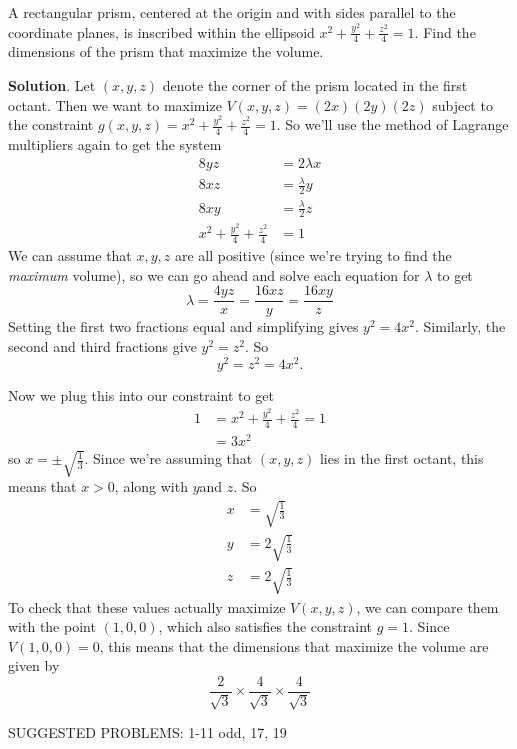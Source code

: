 \documentclass[10pt,]{book}
\theoremstyle{ptxplainnotitle}
\theoremstyle{ptxplaintitle}
\theoremstyle{ptxplainnotitle}
\theoremstyle{ptxplaintitle}
\theoremstyle{ptxplainnotitle}
\theoremstyle{ptxplaintitle}
\theoremstyle{ptxdefinitionnotitle}
\theoremstyle{ptxdefinitiontitle}
\theoremstyle{ptxdefinitionnotitle}
\theoremstyle{ptxdefinitiontitle}
\theoremstyle{ptxdefinitionnotitle}
\theoremstyle{ptxdefinitiontitle}
\theoremstyle{ptxdefinitionnotitle}
\theoremstyle{ptxdefinitiontitle}
\theoremstyle{ptxdefinitionnotitle}
\theoremstyle{ptxdefinitiontitle}
\numberwithin{equation}{section}
\begin{document}
\begin{example}\label{example-maximizing-the-volume-of-a-prism-within-an-ellipsoid}
\hypertarget{p-1109}{}%
A rectangular prism, centered at the origin and with sides parallel to the coordinate planes, is inscribed within the ellipsoid \(x^{2} + \frac{y^{2}}{4} + \frac{z^{2}}{4} = 1\). Find the dimensions of the prism that maximize the volume.%
\par\smallskip%
\noindent\textbf{Solution}.\hypertarget{solution-175}{}\quad%
\hypertarget{p-1110}{}%
Let \((x,y,z)\) denote the corner of the prism located in the first octant. Then we want to maximize \(V(x,y,z) = (2x)(2y)(2z)\) subject to the constraint \(g(x,y,z) = x^{2} + \frac{y^{2}}{4} + \frac{z^{2}}{4} = 1\). So we'll use the method of Lagrange multipliers again to get the system%
\begin{align*}
8yz & = 2\lambda x \\
8xz & = \frac{\lambda}{2}y \\
8xy & = \frac{\lambda}{2}z \\
x^{2} + \frac{y^{2}}{4} + \frac{z^{2}}{4} & =1 
\end{align*}
We can assume that \(x,y,z\) are all positive (since we're trying to find the \emph{maximum} volume), so we can go ahead and solve each equation for \(\lambda\) to get%
\begin{equation*}
\lambda = \frac{4yz}{x} = \frac{16xz}{y} = \frac{16xy}{z}
\end{equation*}
Setting the first two fractions equal and simplifying gives \(y^{2} = 4x^{2}\). Similarly, the second and third fractions give \(y^{2} = z^{2}\). So%
\begin{equation*}
y^{2} = z^{2} = 4x^{2}.
\end{equation*}
%
\par
\hypertarget{p-1111}{}%
Now we plug this into our constraint to get%
\begin{align*}
1 & = x^{2} + \frac{y^{2}}{4} + \frac{z^{2}}{4} = 1 \\
& = 3x^{2} 
\end{align*}
so \(x = \pm\sqrt{\frac{1}{3}}\). Since we're assuming that \((x,y,z)\) lies in the first octant, this means that \(x > 0\), along with \(y \)and \(z\). So%
\begin{align*}
x & = \sqrt{\frac{1}{3}} \\
y & = 2\sqrt{\frac{1}{3}} \\
z & = 2\sqrt{\frac{1}{3}} 
\end{align*}
To check that these values actually maximize \(V(x,y,z)\), we can compare them with the point \((1,0,0)\), which also satisfies the constraint \(g = 1\). Since \(V(1,0,0) = 0\), this means that the dimensions that maximize the volume are given by%
\begin{equation*}
\frac{2}{\sqrt{3}}\times\frac{4}{\sqrt{3}}\times\frac{4}{\sqrt{3}}
\end{equation*}
%
\end{example}
\hypertarget{p-1112}{}%
SUGGESTED PROBLEMS: 1-11 odd, 17, 19%
\typeout{************************************************}
\typeout{************************************************}
\end{document}
